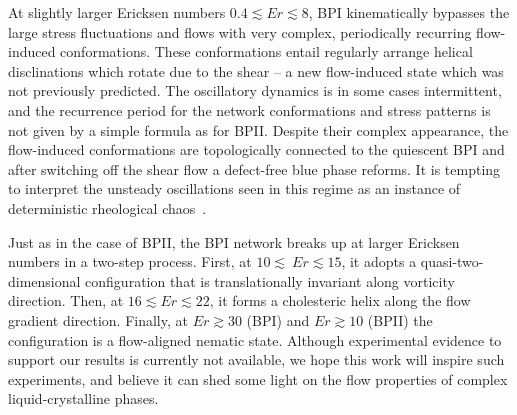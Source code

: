 \documentclass[8.5pt,twoside,twocolumn]{article}
\begin{document}
{At slightly larger Ericksen numbers $0.4\lesssim Er \lesssim8$,
BPI kinematically bypasses the large stress fluctuations and 
flows with very complex, periodically recurring flow-induced conformations.
These conformations entail regularly arrange helical disclinations which 
rotate due to the shear -- a new flow-induced state which was not previously
predicted. 
The oscillatory dynamics is in some cases intermittent, and the
recurrence period for the network conformations and stress patterns
is not given by a simple formula as for BPII.
Despite their complex appearance, the flow-induced conformations are 
topologically connected to the quiescent BPI and after switching off the 
shear flow a defect-free blue phase reforms. It is tempting to
interpret the unsteady oscillations seen in this regime as an instance of 
deterministic rheological chaos~\cite{fielding, Cates:2002}.

Just as in the case of BPII, the BPI network breaks up at larger Ericksen numbers in
a two-step process. First, at $10\lesssim\ Er\lesssim 15$, it adopts a 
quasi-two-dimensional configuration that is translationally invariant along vorticity direction. 
Then, at $16\lesssim Er \lesssim 22$, it forms a cholesteric helix along the flow gradient 
direction.  Finally, at $Er\gtrsim30$ (BPI) and $Er\gtrsim10$ (BPII) the configuration
is a flow-aligned nematic state.
Although experimental evidence to support
our results is currently not available, we hope this work will inspire such experiments, and believe it can shed some light 
on the flow properties of complex liquid-crystalline phases.


%

}
\end{document}
